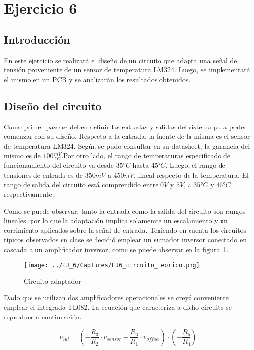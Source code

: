 
\section{Ejercicio 6}

\subsection{Introducción}

En este ejercicio se realizará el diseño de un circuito que adapta una señal de tensión proveniente de un sensor de temperatura LM324. 
Luego, se implementará el mismo en un PCB y se analizarán los resultados obtenidos.

\subsection{Diseño del circuito}

Como primer paso se deben definir las entradas y salidas del sistema para poder comenzar con su diseño. Respecto a la entrada, la fuente de la misma es el sensor de temperatura LM324.
 Según se pudo consultar en su datasheet, la ganancia del mismo es de $100 \frac{mV}{°C}$.Por otro lado, el rango de temperaturas especificado de funcionamiento del circuito va desde $35°C$ hasta $45°C$.
 Luego, el rango de tensiones de entrada es de $350mV$ a $450mV$, lineal respecto de la temperatura. El rango de salida del circuito está comprendido entre $0V$ y $5V$, a  $35°C$ y $45°C$ respectivamente. 

 
 Como se puede observar, tanto la entrada como la salida del circuito son rangos lineales, por lo que la adaptación implica solamemte un escalamiento y un corrimiento aplicados sobre la señal de entrada.
  Teniendo en cuenta los circuitos típicos observados en clase se decidió emplear un sumador inversor conectado en cascada a un amplificador inversor, como se puede observar en la figura~\ref{fig:EJ6_circuito}.  
  
\begin{figure}[H]
    \centering
    \texttt{[image: ../EJ\_6/Captures/EJ6\_circuito\_teorico.png]}
    \caption{Circuito adaptador}
    \label{fig:EJ6_circuito} 
\end{figure}

Dado que se utilizan dos amplificadores operacionales se creyó conveniente emplear el integrado TL082. La ecuación que caracteriza a dicho circuito se reproduce a continuación.

\begin{equation}
    v_{out}= \left( - \frac{R_3}{R_2} \cdot v_{sensor}  - \frac{R_3}{R_1} \cdot v_{offset} \right) \cdot \left( -\frac{R_5}{R_4}   \right)
    \label{fig:EJ6_ecuacion_sistema} 
\end{equation}

